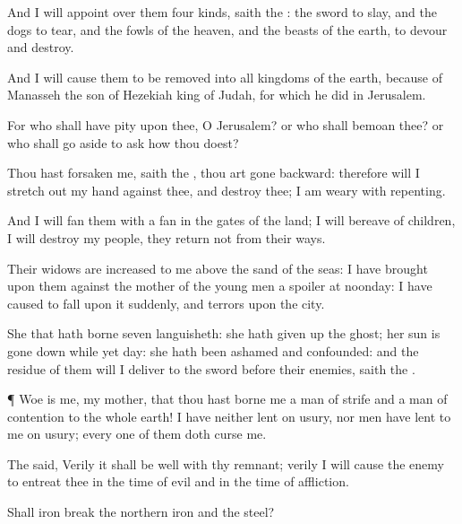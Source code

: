 {And I will
appoint over them
four
kinds,
saith the
{}: the
sword to
slay, and the
dogs to
tear, and the
fowls of the
heaven, and the
beasts of the
earth, to
devour and
destroy.

And I will
cause them to be
removed into all
kingdoms of the
earth,
because of
Manasseh the
son of
Hezekiah
king of
Judah, for
{} which he
did in
Jerusalem.

For who shall have
pity upon thee, O
Jerusalem? or who shall
bemoan thee? or who shall go
aside to
ask how thou
doest?

Thou hast
forsaken me,
saith the
{}, thou art
gone
backward: therefore will I stretch
out my
hand against thee, and
destroy thee; I am
weary with
repenting.

And I will
fan them with a
fan in the
gates of the
land; I will
bereave
{} of children, I will
destroy my
people,
{} they
return not from their
ways.

Their
widows are
increased to me above the
sand of the
seas: I have
brought upon them against the
mother of the young
men a
spoiler at
noonday: I have caused
{} to
fall upon it
suddenly, and
terrors upon the
city.

She that hath
borne
seven
languisheth: she hath given
up the
ghost; her
sun is
gone down while
{} yet
day: she hath been
ashamed and
confounded: and the
residue of them will I
deliver to the
sword
before their
enemies,
saith the
{}.


\par }{\PP {}¶
Woe is me, my
mother, that thou hast
borne me a
man of
strife and a
man of
contention to the whole
earth! I have neither lent on
usury, nor men have lent to me on
usury;
{} every one of them doth
curse me.

The
{}
said,
Verily it shall be
well with thy
remnant;
verily I will cause the
enemy to
entreat thee
{} in the
time of
evil and in the
time of
affliction.

Shall
iron
break the
northern
iron and the
steel?

}
